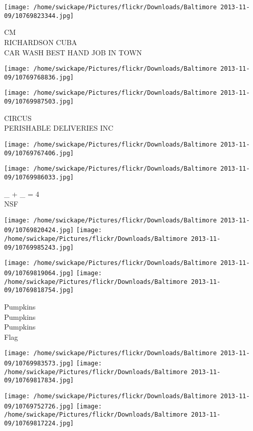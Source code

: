 \documentclass[10pt,letterpaper]{article}
\begin{document}
\texttt{[image: /home/swickape/Pictures/flickr/Downloads/Baltimore 2013-11-09/10769823344.jpg]}

CM\\
RICHARDSON CUBA\\
CAR WASH BEST HAND JOB IN TOWN\\
\pagebreak

\texttt{[image: /home/swickape/Pictures/flickr/Downloads/Baltimore 2013-11-09/10769768836.jpg]}

\vspace{0.25in}
\texttt{[image: /home/swickape/Pictures/flickr/Downloads/Baltimore 2013-11-09/10769987503.jpg]}

CIRCUS\\
PERISHABLE DELIVERIES INC\\
\pagebreak

\texttt{[image: /home/swickape/Pictures/flickr/Downloads/Baltimore 2013-11-09/10769767406.jpg]}

\vspace{0.25in}
\texttt{[image: /home/swickape/Pictures/flickr/Downloads/Baltimore 2013-11-09/10769986033.jpg]}

\_ + \_ = 4\\
NSF\\
\pagebreak

\texttt{[image: /home/swickape/Pictures/flickr/Downloads/Baltimore 2013-11-09/10769820424.jpg]}
\texttt{[image: /home/swickape/Pictures/flickr/Downloads/Baltimore 2013-11-09/10769985243.jpg]}

\texttt{[image: /home/swickape/Pictures/flickr/Downloads/Baltimore 2013-11-09/10769819064.jpg]}
\texttt{[image: /home/swickape/Pictures/flickr/Downloads/Baltimore 2013-11-09/10769818754.jpg]}

Pumpkins\\
Pumpkins\\
Pumpkins\\
Flag\\
\pagebreak

\texttt{[image: /home/swickape/Pictures/flickr/Downloads/Baltimore 2013-11-09/10769983573.jpg]}
\texttt{[image: /home/swickape/Pictures/flickr/Downloads/Baltimore 2013-11-09/10769817834.jpg]}

\texttt{[image: /home/swickape/Pictures/flickr/Downloads/Baltimore 2013-11-09/10769752726.jpg]}
\texttt{[image: /home/swickape/Pictures/flickr/Downloads/Baltimore 2013-11-09/10769817224.jpg]}
\end{document}
